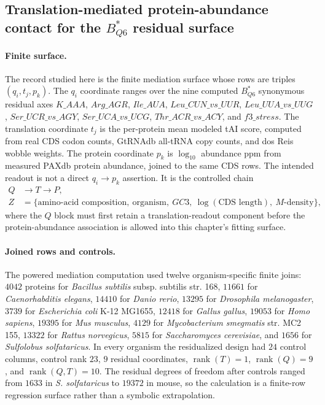 \subsection{Translation-mediated protein-abundance contact for the $B^{*}_{Q6}$ residual surface}\label{sec:q6-translation-mediated-protein-abundance-cross-layer}

\paragraph{Finite surface.}
The record studied here is the finite mediation surface whose rows are triples $(q_i,t_j,p_k)$. The $q_i$ coordinate ranges over the nine computed $B^{*}_{Q6}$ synonymous residual axes
$K\_AAA$, $Arg\_AGR$, $Ile\_AUA$, $Leu\_CUN\_vs\_UUR$, $Leu\_UUA\_vs\_UUG$, $Ser\_UCR\_vs\_AGY$, $Ser\_UCA\_vs\_UCG$, $Thr\_ACR\_vs\_ACY$, and $f3\_stress$. The translation coordinate $t_j$ is the per-protein mean modeled tAI score, computed from real CDS codon counts, GtRNAdb all-tRNA copy counts, and dos Reis wobble weights. The protein coordinate $p_k$ is $\log_{10}$ abundance ppm from measured PAXdb protein abundance, joined to the same CDS rows. The intended readout is not a direct $q_i \to p_k$ assertion. It is the controlled chain
$$
\begin{aligned}
Q &\longrightarrow T \longrightarrow P,\\
Z &= \{\text{amino-acid composition},\ \text{organism},\ GC3,\ \log(\text{CDS length}),\ M\text{-density}\},
\end{aligned}
$$
where the $Q$ block must first retain a translation-readout component before the protein-abundance association is allowed into this chapter's fitting surface.

\paragraph{Joined rows and controls.}
The powered mediation computation used twelve organism-specific finite joins: $4042$ proteins for \emph{Bacillus subtilis} subsp. subtilis str. 168, $11661$ for \emph{Caenorhabditis elegans}, $14410$ for \emph{Danio rerio}, $13295$ for \emph{Drosophila melanogaster}, $3739$ for \emph{Escherichia coli} K-12 MG1655, $12418$ for \emph{Gallus gallus}, $19053$ for \emph{Homo sapiens}, $19395$ for \emph{Mus musculus}, $4129$ for \emph{Mycobacterium smegmatis} str. MC2 155, $13322$ for \emph{Rattus norvegicus}, $5815$ for \emph{Saccharomyces cerevisiae}, and $1656$ for \emph{Sulfolobus solfataricus}. In every organism the residualized design had $24$ control columns, control rank $23$, $9$ residual coordinates, $\operatorname{rank}(T)=1$, $\operatorname{rank}(Q)=9$, and $\operatorname{rank}(Q,T)=10$. The residual degrees of freedom after controls ranged from $1633$ in \emph{S. solfataricus} to $19372$ in mouse, so the calculation is a finite-row regression surface rather than a symbolic extrapolation.

